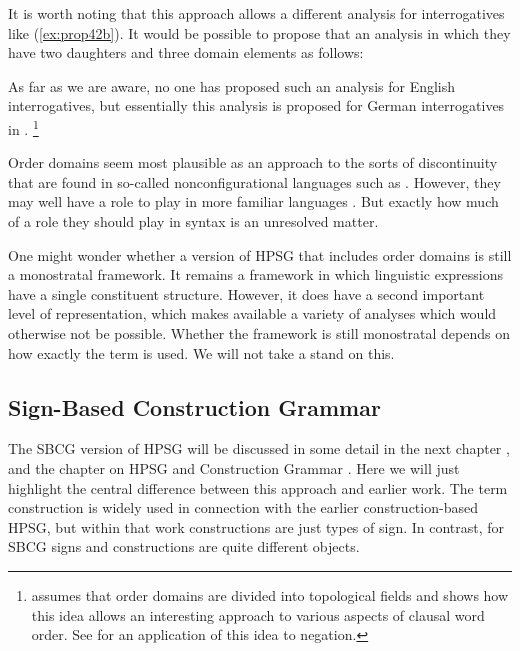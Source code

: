 \documentclass[output=paper
	        ,collection
	        ,collectionchapter
 	        ,biblatex
                ,babelshorthands
                ,newtxmath
                ,draftmode
                ,colorlinks, citecolor=brown
]{langscibook}
\begin{document}
It is worth noting that this approach allows a different analysis for interrogatives like (\ref{ex:prop42b}). It would be possible to propose that an analysis in which they have two daughters and three domain elements as follows:

\ea\label{ex:prop47}
\z

As far as we are aware, no one has proposed such an analysis for English interrogatives, but essentially this analysis is proposed for German interrogatives in \citet[81]{Kathol2000a}.%
%
\footnote{\citet{Kathol2000a} assumes that order domains are divided into topological fields and shows how this idea allows an interesting approach to various aspects of clausal word order. See \citet{Borsley:06} for an application of this idea to negation.}
%

Order domains seem most plausible as an approach to the sorts of discontinuity that are found in so-called nonconfigurational languages such as  \citep{DS99a}. However, they may well have a role to play in more familiar languages \citep{BGM99a,Chaves2014a-u}. But exactly how much of a role they should play in syntax is an unresolved matter.

One might wonder whether a version of HPSG that includes order domains is still a monostratal framework. It remains a framework in which linguistic expressions have a single constituent structure. However, it does have a second important level of representation, which makes available a variety of analyses which would otherwise not be possible. Whether the framework is still monostratal depends on how exactly the term is used. We will not take a stand on this.

\subsection{Sign-Based Construction Grammar}\label{sec:prop7.2}

The SBCG version of HPSG will be discussed in some detail in the next chapter , and the chapter on HPSG and Construction Grammar . Here we will just highlight the central difference between this approach and earlier work. The term construction is widely used in connection with the earlier construction-based HPSG, but within that work constructions are just types of sign. In contrast, for SBCG signs and constructions are quite different objects.
\end{document}
